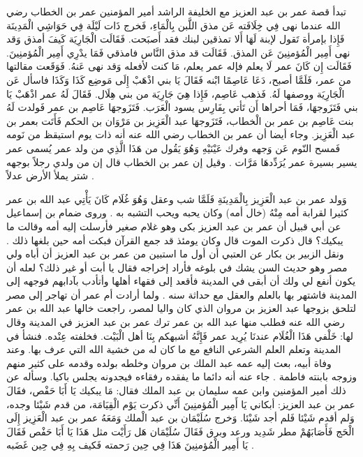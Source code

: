 تبدأ قصة عمر بن عبد العزيز مع الخليفة الراشد أمير المؤمنين عمر بن الخطاب رضي الله عندما نهى فِي خِلَافَته عَن مذق اللَّبن بِالْمَاءِ، فَخرج ذَات لَيْلَة فِي حَوَاشِي الْمَدِينَة فَإِذا بإمرأة تَقول لإبنة لَهَا أَلا تمذقين لبنك فقد أَصبَحت. فَقَالَت الْجَارِيَة كَيفَ أمذق وَقد نهى أَمِير الْمُؤمنِينَ عَن المذق. فَقَالَت قد مذق النَّاس فامذقي فَمَا يدْرِي أَمِير الْمُؤمنِينَ. فَقَالَت إِن كَانَ عمر لَا يعلم فإله عمر يعلم، مَا كنت لأفعله وَقد نهى عَنهُ. فَوَقَعت مقالتها من عمر، فَلَمَّا أصبح، دَعَا عَاصِمًا ابْنه فَقَالَ يَا بني اذْهَبْ إِلَى مَوضِع كَذَا وَكَذَا فاسأل عَن الْجَارِيَة ووصفها لَهُ. فَذهب عَاصِم، فَإِذا هِيَ جَارِيَة من بني هِلَال. فَقَالَ لَهُ عمر اذْهَبْ يَا بني فَتَزَوجهَا، فَمَا أحراها أَن تَأتي بِفَارِس يسود الْعَرَب. فَتَزَوجهَا عَاصِم بن عمر فَولدت لَهُ بنت عَاصِم بن عمر بن الْخطاب، فَتَزَوجهَا عبد الْعَزِيز بن مَرْوَان بن الحكم فَأَتَت بعمر بن عبد الْعَزِيز. وجاء أيضا أن عمر بن الخطاب رضي الله عنه أنه ذات يوم استيقظ من نَومه فَمسح النّوم عَن وَجهه وفرك عَيْنَيْهِ وَهُوَ يَقُول من هَذَا الَّذِي من ولد عمر يُسمى عمر يسير بسيرة عمر يُرَدِّدهَا مَرَّات \cite{ibnAbdAlHakam_OmarIbnAbdAlAziz}. وقيل إن عمر بن الخطاب قال إن من ولدي رجلاً بوجهه شتر يملأ الأرض عدلاً \cite{dahabi_Siyar}.

وَولد عمر بن عبد الْعَزِيز بِالْمَدِينَةِ فَلَمَّا شب وعقل وَهُوَ غُلَام كَانَ يَأْتِي عبد الله بن عمر كثيرا لقرابة أمه مِنْهُ (خال أمه) وكان يحبه ويحب التشبه به \cite{ibnAbdAlHakam_OmarIbnAbdAlAziz}. وروى ضمام بن إسماعيل عن أبي قبيل أن عمر بن عبد العزيز بكى وهو غلام صغير فأرسلت إليه أمه وقالت ما يبكيك؟ قال ذكرت الموت قال وكان يومئذ قد جمع القرآن فبكت أمه حين بلغها ذلك \cite{dahabi_Siyar}. ونقل الزبير بن بكار عن العتبي أن أول ما استبين من عمر بن عبد العزيز أن أباه ولي مصر وهو حديث السن يشك في بلوغه فأراد إخراجه فقال يا أبت أو غير ذلك؟ لعله أن يكون أنفع لي ولك أن أبقى في المدينة فأقعد إلى فقهاء أهلها وأتأدب بآدابهم فوجهه إلى المدينة فاشتهر بها بالعلم والعقل مع حداثة سنه \cite{dahabi_Siyar}. ولما أرادت أم عمر أن تهاجر إلى مصر لتلحق بزوجها عبد العزيز بن مروان الذي كان واليا لمصر، راجعت خالها عبد الله بن عمر رضي الله عنه فطلب منها عبد الله بن عمر ترك عمر بن عبد العزيز في المدينة وقال لها: خَلْفي هَذَا الْغُلَام عندنَا يُرِيد عمر فَإِنَّهُ أشبهكم بِنَا أهل الْبَيْت. فخلفته عِنْده. فنشأ في المدينة وتعلم العلم الشرعي النافع مع ما كان له من خشية الله التي عرف بها. وعند وفاة أبيه، بعث إليه عمه عبد الملك بن مروان وخلطه بولده وقدمه على كثير منهم وزوجه بابنته فاطمة \cite{dahabi_Siyar}. جاء عنه أنه دائما ما يفقده رفقاءه فيجدونه يجلس باكيا. وسأله عن ذلك أمير المؤمنين وابن عمه سليمان بن عبد الملك فقال: مَا يبكيك يَا أَبَا حَفْص، فقَالَ عمر بن عبد العزيز: أبكاني يَا أَمِير الْمُؤمنِينَ أَنِّي ذكرت يَوْم الْقِيَامَة، من قدم شَيْئا وجده، وَلم أقدم شَيْئا فَلم أجد شَيْئا. وَخرج سُلَيْمَان بن عبد الْملك وَمَعَهُ عمر بن عبد الْعَزِيز إِلَى الْحَج فَأَصَابَهُمْ مطر شَدِيد ورعد وبرق فَقَالَ سُلَيْمَان هَل رَأَيْت مثل هَذَا يَا أَبَا حَفْص فَقَالَ يَا أَمِير الْمُؤمنِينَ هَذَا فِي حِين رَحمته فَكيف بِهِ فِي حِين غَضَبه \cite{ibnAbdAlHakam_OmarIbnAbdAlAziz}. 

